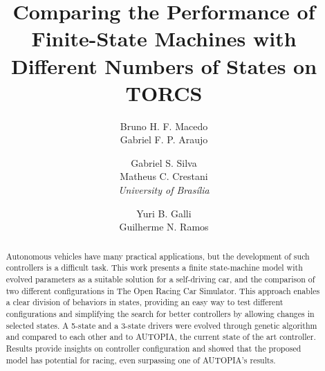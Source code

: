 \documentclass[a4paper]{sbgames}
\title{Comparing the Performance of Finite-State Machines with Different Numbers of States on TORCS}
\author{Bruno H. F. Macedo\\Gabriel F. P. Araujo\\
		\and Gabriel S. Silva\\Matheus C. Crestani\\\textit{University of Bras\'{i}lia}
		\and Yuri B. Galli\\ Guilherme N. Ramos\\
}
\begin{document}
	\maketitle

	\begin{abstract}
		Autonomous vehicles have many practical applications, but the development of such controllers is a difficult task. This work presents a finite state-machine model with evolved parameters as a suitable solution for a self-driving car, and the comparison of two different configurations in The Open Racing Car Simulator. This approach enables a clear division of behaviors in states, providing an easy way to test different configurations and simplifying the search for better controllers by allowing changes in selected states. A 5-state and a 3-state drivers were evolved through genetic algorithm and compared to each other and to AUTOPIA, the current state of the art controller. Results provide insights on controller configuration and showed that the proposed model has potential for racing, even surpassing  one of AUTOPIA's results.
	\end{abstract}

	\keywordlist
	\contactlist

	
	
	
	
	
	


	
	
\end{document}
